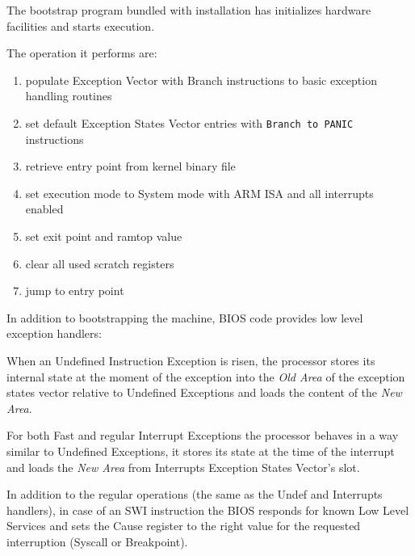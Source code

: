 


The bootstrap program bundled with \uarm{} installation has initializes hardware facilities and starts execution.

The operation it performs are:

\begin{enumerate}
\item populate Exception Vector with Branch instructions to basic exception handling routines
\item set default Exception States Vector entries with \texttt{Branch to PANIC} instructions
\item retrieve entry point from kernel binary file
\item set execution mode to System mode with ARM ISA and all interrupts enabled
\item set exit point and ramtop value
\item clear all used scratch registers
\item jump to entry point
\end{enumerate}


In addition to bootstrapping the machine, BIOS code provides low level exception handlers:


When an Undefined Instruction Exception is risen, the processor stores its internal state at the moment of the exception into the \emph{Old Area} of the exception states vector relative to Undefined Exceptions and loads the content of the \emph{New Area}.


For both Fast and regular Interrupt Exceptions the processor behaves in a way similar to Undefined Exceptions, it stores its state at the time of the interrupt and loads the \emph{New Area} from Interrupts Exception States Vector's slot.


In addition to the regular operations (the same as the Undef and Interrupts handlers), in case of an SWI instruction the BIOS responds for known Low Level Services and sets the Cause register to the right value for the requested interruption (Syscall or Breakpoint).


